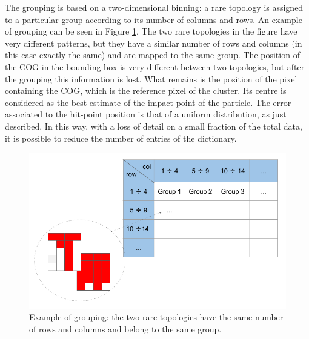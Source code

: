 The grouping is based on a two-dimensional binning: a rare topology is assigned to a particular group according to its number of columns and rows. An example of grouping can be seen in Figure \ref{fig:gruppi}. The two rare topologies in the figure have very different patterns, but they have a similar number of rows and columns (in this case exactly the same) and are mapped to the same group. The position of the COG in the bounding box is very different between two topologies, but after the grouping this information is lost. What remains is the position of the pixel containing the COG, which is the reference pixel of the cluster. Its centre is considered as the best estimate of the impact point of the particle. The error associated to the hit-point position is that of a uniform distribution, as just described. In this way, with a loss of detail on a small fraction of the total data, it is possible to reduce the number of entries of the dictionary.
%
\begin{figure}
  \centering
  \includegraphics[scale=0.5]{figures/gruppi.png}
  \caption{Example of grouping: the two rare topologies have the same number of rows and columns and belong to the same group.}
  \label{fig:gruppi}
\end{figure}
%
